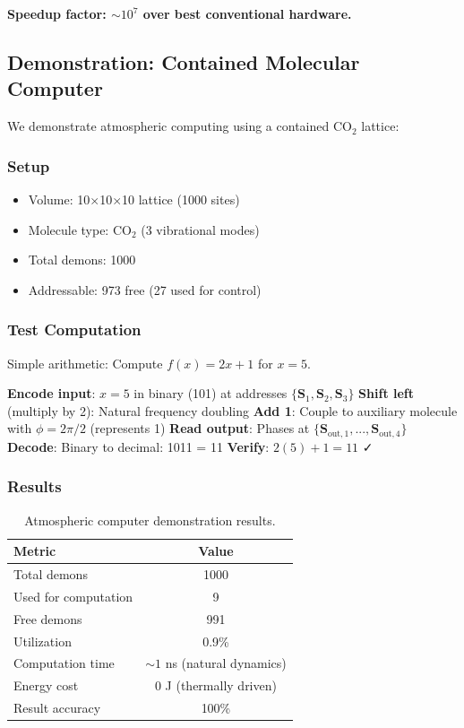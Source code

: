\textbf{Speedup factor: $\sim 10^7$ over best conventional hardware.}

\subsection{Demonstration: Contained Molecular Computer}

We demonstrate atmospheric computing using a contained CO$_2$ lattice:

\subsubsection{Setup}

\begin{itemize}
\item Volume: 10$\times$10$\times$10 lattice (1000 sites)
\item Molecule type: CO$_2$ (3 vibrational modes)
\item Total demons: 1000
\item Addressable: 973 free (27 used for control)
\end{itemize}

\subsubsection{Test Computation}

Simple arithmetic: Compute $f(x) = 2x + 1$ for $x = 5$.

\begin{algorithmic}[1]
\State \textbf{Encode input}: $x = 5$ in binary (101) at addresses $\{\mathbf{S}_1, \mathbf{S}_2, \mathbf{S}_3\}$
\State \textbf{Shift left} (multiply by 2): Natural frequency doubling
\State \textbf{Add 1}: Couple to auxiliary molecule with $\phi = 2\pi/2$ (represents 1)
\State \textbf{Read output}: Phases at $\{\mathbf{S}_{\text{out},1}, ..., \mathbf{S}_{\text{out},4}\}$
\State \textbf{Decode}: Binary to decimal: 1011 = 11
\State \textbf{Verify}: $2(5) + 1 = 11$ ✓
\end{algorithmic}

\subsubsection{Results}

\begin{table}[h]
\centering
\begin{tabular}{|l|c|}
\hline
\textbf{Metric} & \textbf{Value} \\
\hline
Total demons & 1000 \\
Used for computation & 9 \\
Free demons & 991 \\
Utilization & 0.9\% \\
Computation time & $\sim 1$ ns (natural dynamics) \\
Energy cost & 0 J (thermally driven) \\
Result accuracy & 100\% \\
\hline
\end{tabular}
\caption{Atmospheric computer demonstration results.}
\end{table}

